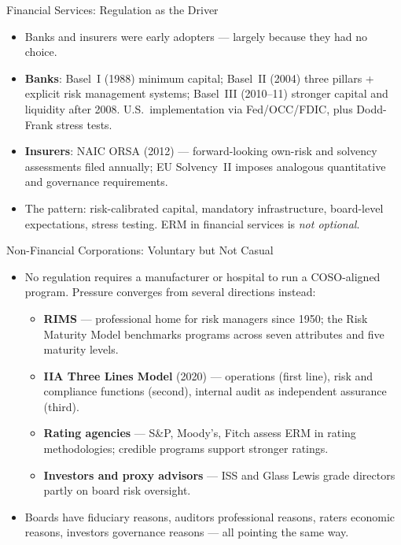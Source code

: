 \documentclass[11pt, aspectratio=169]{beamer}
\begin{document}
\begin{frame}{Financial Services: Regulation as the Driver}
\begin{itemize}
  \item Banks and insurers were early adopters --- largely because they had no choice.
  \item \textbf{Banks}: Basel~I (1988) minimum capital; Basel~II (2004) three pillars + explicit risk management systems; Basel~III (2010--11) stronger capital and liquidity after 2008. U.S.\ implementation via Fed/OCC/FDIC, plus Dodd-Frank \alert{stress tests}.
  \item \textbf{Insurers}: NAIC \alert{ORSA} (2012) --- forward-looking own-risk and solvency assessments filed annually; EU \alert{Solvency~II} imposes analogous quantitative and governance requirements.
  \item The pattern: risk-calibrated capital, mandatory infrastructure, board-level expectations, stress testing. ERM in financial services is \emph{not optional}.
\end{itemize}
\end{frame}

\begin{frame}{Non-Financial Corporations: Voluntary but Not Casual}
\begin{itemize}
  \item No regulation requires a manufacturer or hospital to run a COSO-aligned program. Pressure converges from several directions instead:
  \begin{itemize}
    \item \textbf{RIMS} --- professional home for risk managers since 1950; the Risk Maturity Model benchmarks programs across seven attributes and five maturity levels.
    \item \textbf{IIA Three Lines Model} (2020) --- operations (first line), risk and compliance functions (second), internal audit as \alert{independent assurance} (third).
    \item \textbf{Rating agencies} --- S\&P, Moody's, Fitch assess ERM in rating methodologies; credible programs support stronger ratings.
    \item \textbf{Investors and proxy advisors} --- ISS and Glass Lewis grade directors partly on board risk oversight.
  \end{itemize}
  \item Boards have fiduciary reasons, auditors professional reasons, raters economic reasons, investors governance reasons --- all pointing the same way.
\end{itemize}
\end{frame}
\end{document}
